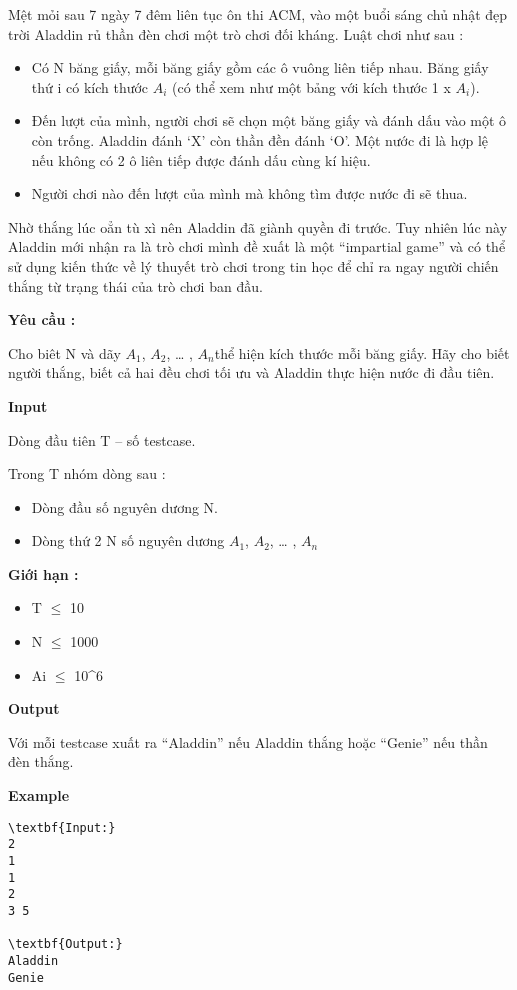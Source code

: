 

Mệt mỏi sau 7 ngày 7 đêm liên tục ôn thi ACM, vào một buổi sáng chủ nhật đẹp trời Aladdin rủ thần đèn chơi một trò chơi đối kháng. Luật chơi như sau :
\begin{itemize}
	\item Có N băng giấy, mỗi băng giấy gồm các ô vuông liên tiếp nhau. Băng giấy thứ i có kích thước $A_{i}$ (có thể xem như một bảng với kích thước 1 x $A_{i}$).
	\item Đến lượt của mình, người chơi sẽ chọn một băng giấy và đánh dấu vào một ô còn trống. Aladdin đánh ‘X’ còn thần đền đánh ‘O’. Một nước đi là hợp lệ nếu không có 2 ô liên tiếp được đánh dấu cùng kí hiệu.
	\item Người chơi nào đến lượt của mình mà không tìm được nước đi sẽ thua.
\end{itemize}

Nhờ thắng lúc oẳn tù xì nên Aladdin đã giành quyền đi trước. Tuy nhiên lúc này Aladdin mới nhận ra là trò chơi mình đề xuất là một “impartial game” và có thể sử dụng kiến thức về lý thuyết trò chơi trong tin học để chỉ ra ngay người chiến thắng từ trạng thái của trò chơi ban đầu.

\textbf{Yêu cầu :}

Cho biêt N và dãy $A_{1}$, $A_{2}$, … , $A_{n}$thể hiện kích thước mỗi băng giấy. Hãy cho biết người thắng, biết cả hai đều chơi tối ưu và Aladdin thực hiện nước đi đầu tiên.

\textbf{Input}

Dòng đầu tiên T – số testcase.


Trong T nhóm dòng sau :
\begin{itemize}
	\item Dòng đầu số nguyên dương N.
	\item Dòng thứ 2 N số nguyên dương $A_{1}$, $A_{2}$, … , $A_{n}$
\end{itemize}

\textbf{Giới hạn : }
\begin{itemize}
	\item T  $\le$  10
	\item N  $\le$  1000
	\item Ai  $\le$  10^6
\end{itemize}

\textbf{Output}

Với mỗi testcase xuất ra “Aladdin” nếu Aladdin thắng hoặc “Genie” nếu thần đèn thắng.

\textbf{Example}
\begin{verbatim}
\textbf{Input:}
2
1
1
2
3 5

\textbf{Output:}
Aladdin
Genie\end{verbatim}
